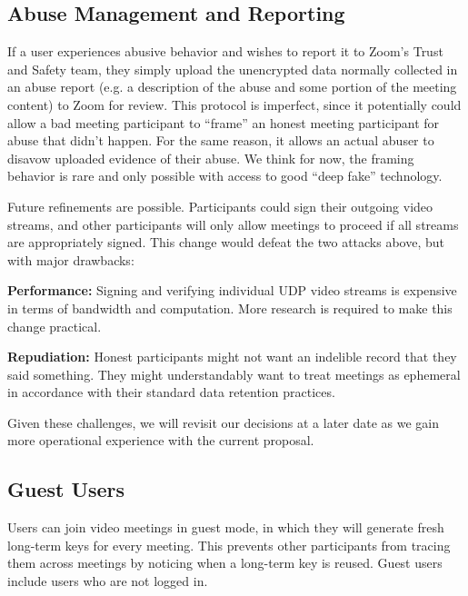 \subsection{Abuse Management and Reporting}
If a user experiences abusive behavior and wishes to report it to Zoom's Trust and Safety team, they simply upload the unencrypted data normally collected in an abuse report (e.g. a description of the abuse and some portion of the meeting content) to Zoom for review. This protocol is imperfect, since it potentially could allow a bad meeting participant to ``frame'' an honest meeting participant for abuse that didn't happen. For the same reason, it allows an actual abuser to disavow uploaded evidence of their abuse. We think for now, the framing behavior is rare and only possible with access to good ``deep fake'' technology.

Future refinements are possible. Participants could sign their outgoing video streams, and other participants will only allow meetings to proceed if all streams are appropriately signed. This change would defeat the two attacks above, but with major drawbacks:
%
\begin{description}
    \item {\bf Performance:} Signing and verifying individual UDP video streams is expensive in terms of bandwidth and computation. More research is required to make this change practical.
    \item {\bf Repudiation:} Honest participants might not want an indelible record that they said something. They might understandably want to treat meetings as ephemeral in accordance with their standard data retention practices.
\end{description}

Given these challenges, we will revisit our decisions at a later date as we gain more operational experience with the current proposal.

\subsection{Guest Users}
Users can join video meetings in guest mode, in which they will generate fresh long-term keys for every meeting. This prevents other participants from tracing them across meetings by noticing when a long-term key is reused. Guest users include users who are not logged in.

